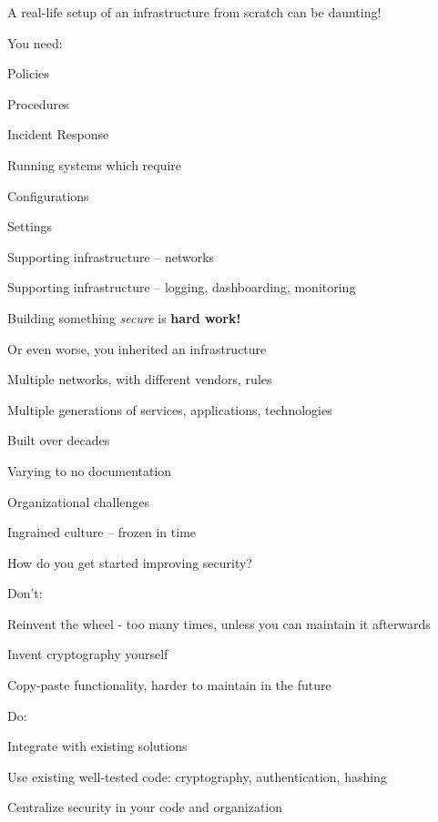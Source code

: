 \documentclass[Screen16to9,17pt]{foils}
\begin{document}

\begin{list1}
\item A real-life setup of an infrastructure from scratch can be daunting!
\item You need:
\begin{list2}
\item Policies
\item Procedures
\item Incident Response
\end{list2}
\item Running systems which require
\begin{list2}
\item Configurations
\item Settings
\item Supporting infrastructure -- networks
\item Supporting infrastructure -- logging, dashboarding, monitoring
\end{list2}
\item Building something \emph{secure} is {\bf hard work!}
\end{list1}




\begin{list1}
\item Or even worse, you inherited an infrastructure
\item Multiple networks, with different vendors, rules
\item Multiple generations of services, applications, technologies
\item Built over decades
\item Varying to no documentation
\item Organizational challenges
\item Ingrained culture -- frozen in time
\end{list1}

How do you get started improving security?


\begin{list1}
\item Don't:
\begin{list2}
\item Reinvent the wheel - too many times, unless you can maintain it afterwards
\item Invent cryptography yourself
\item Copy-paste functionality, harder to maintain in the future
\end{list2}
\item Do:
\begin{list2}
\item Integrate with existing solutions
\item Use existing well-tested code: cryptography, authentication, hashing
\item Centralize security in your code and organization
\end{list2}
\end{list1}
\end{document}
